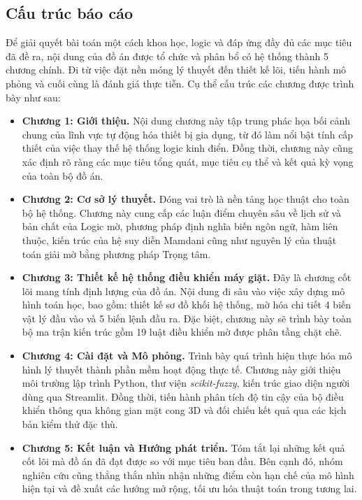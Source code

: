 \documentclass[12pt, a4paper]{article}
\begin{document}
\subsection{Cấu trúc báo cáo}
Để giải quyết bài toán một cách khoa học, logic và đáp ứng đầy đủ các mục tiêu đã đề ra, nội dung của đồ án được tổ chức và phân bổ có hệ thống thành 5 chương chính. Đi từ việc đặt nền móng lý thuyết đến thiết kế lõi, tiến hành mô phỏng và cuối cùng là đánh giá thực tiễn. Cụ thể cấu trúc các chương được trình bày như sau:
\begin{itemize}
    \item \textbf{Chương 1: Giới thiệu.} Nội dung chương này tập trung phác họa bối cảnh chung của lĩnh vực tự động hóa thiết bị gia dụng, từ đó làm nổi bật tính cấp thiết của việc thay thế hệ thống logic kinh điển. Đồng thời, chương này cũng xác định rõ ràng các mục tiêu tổng quát, mục tiêu cụ thể và kết quả kỳ vọng của toàn bộ đồ án.
    \item \textbf{Chương 2: Cơ sở lý thuyết.} Đóng vai trò là nền tảng học thuật cho toàn bộ hệ thống. Chương này cung cấp các luận điểm chuyên sâu về lịch sử và bản chất của Logic mờ, phương pháp định nghĩa biến ngôn ngữ, hàm liên thuộc, kiến trúc của hệ suy diễn Mamdani cũng như nguyên lý của thuật toán giải mờ bằng phương pháp Trọng tâm.
    \item \textbf{Chương 3: Thiết kế hệ thống điều khiển máy giặt.} Đây là chương cốt lõi mang tính định lượng của đồ án. Nội dung đi sâu vào việc xây dựng mô hình toán học, bao gồm: thiết kế sơ đồ khối hệ thống, mờ hóa chi tiết 4 biến vật lý đầu vào và 5 biến lệnh đầu ra. Đặc biệt, chương này sẽ trình bày toàn bộ ma trận kiến trúc gồm 19 luật điều khiển mờ được phân tầng chặt chẽ.
    \item \textbf{Chương 4: Cài đặt và Mô phỏng.} Trình bày quá trình hiện thực hóa mô hình lý thuyết thành phần mềm hoạt động thực tế. Chương này giới thiệu môi trường lập trình Python, thư viện \textit{scikit-fuzzy}, kiến trúc giao diện người dùng qua Streamlit. Đồng thời, tiến hành phân tích độ tin cậy của bộ điều khiển thông qua không gian mặt cong 3D và đối chiếu kết quả qua các kịch bản kiểm thử đặc thù.
    \item \textbf{Chương 5: Kết luận và Hướng phát triển.} Tóm tắt lại những kết quả cốt lõi mà đồ án đã đạt được so với mục tiêu ban đầu. Bên cạnh đó, nhóm nghiên cứu cũng thẳng thắn nhìn nhận những điểm còn hạn chế của mô hình hiện tại và đề xuất các hướng mở rộng, tối ưu hóa thuật toán trong tương lai.
\end{itemize}
\end{document}
